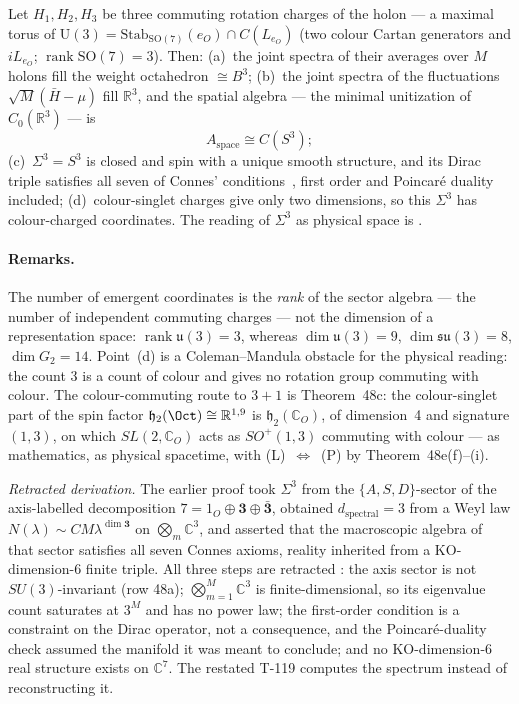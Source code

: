 \begin{theorembox}
Let $H_1, H_2, H_3$ be three commuting rotation charges of the holon --- a maximal torus of
$\mathrm{U}(3) = \mathrm{Stab}_{\mathrm{SO}(7)}(e_O) \cap C(L_{e_O})$ (two colour Cartan
generators and $iL_{e_O}$; $\operatorname{rank}\mathrm{SO}(7) = 3$). Then:
(a)~the joint spectra of their averages over $M$ holons fill the weight octahedron
$\cong B^3$; (b)~the joint spectra of the fluctuations $\sqrt{M}(\bar H - \mu)$ fill
$\mathbb{R}^3$, and the spatial algebra --- the minimal unitization of $C_0(\mathbb{R}^3)$
--- is
\begin{equation}
  A_{\mathrm{space}} \cong C(S^3);
  \label{eq:spatial-algebra}
\end{equation}
(c)~$\Sigma^3 = S^3$ is closed and spin with a unique smooth structure, and its Dirac triple
satisfies all seven of Connes' conditions~\cite{connes2008reconstruction}, first order and
Poincar\'e duality included; (d)~colour-singlet charges give only two dimensions, so this
$\Sigma^3$ has colour-charged coordinates. The reading of $\Sigma^3$ as physical space is
.
\end{theorembox}

\paragraph{Remarks.}
The number of emergent coordinates is the \emph{rank} of the sector algebra --- the number of
independent commuting charges --- not the dimension of a representation space:
$\operatorname{rank}\mathfrak{u}(3) = 3$, whereas $\dim\mathfrak{u}(3) = 9$,
$\dim\mathfrak{su}(3) = 8$, $\dim G_2 = 14$. Point~(d) is a Coleman--Mandula obstacle for
the physical reading: the count $3$ is a count of colour and gives no rotation group
commuting with colour. The colour-commuting route to $3+1$ is Theorem~48c: the colour-singlet
part of the spin factor $\mathfrak h_2(\Oct) \cong \mathbb{R}^{1,9}$ is
$\mathfrak h_2(\mathbb{C}_O)$, of dimension~4 and signature $(1,3)$, on which
$SL(2,\mathbb{C}_O)$ acts as $SO^+(1,3)$ commuting with colour ---  as
mathematics,  as physical spacetime, with (L)~$\Leftrightarrow$~(P) by
Theorem~48e(f)--(i).

\noindent\emph{Retracted derivation.} The earlier proof took $\Sigma^3$ from the
$\{A,S,D\}$-sector of the axis-labelled decomposition $7 = 1_O \oplus \mathbf{3} \oplus
\bar{\mathbf{3}}$, obtained $d_{\mathrm{spectral}} = 3$ from a Weyl law
$N(\lambda) \sim C M \lambda^{\dim\mathbf{3}}$ on $\bigotimes_m \mathbb{C}^3$, and asserted
that the macroscopic algebra of that sector satisfies all seven Connes axioms, reality
inherited from a KO-dimension-6 finite triple. All three steps are retracted
\status{$\times$}: the axis sector is not $SU(3)$-invariant (row 48a); $\bigotimes_{m=1}^M
\mathbb{C}^3$ is finite-dimensional, so its eigenvalue count saturates at $3^M$ and has no
power law; the first-order condition is a constraint on the Dirac operator, not a
consequence, and the Poincar\'e-duality check assumed the manifold it was meant to
conclude; and no KO-dimension-6 real structure exists on $\mathbb{C}^7$. The restated
T-119 computes the spectrum instead of reconstructing it.

